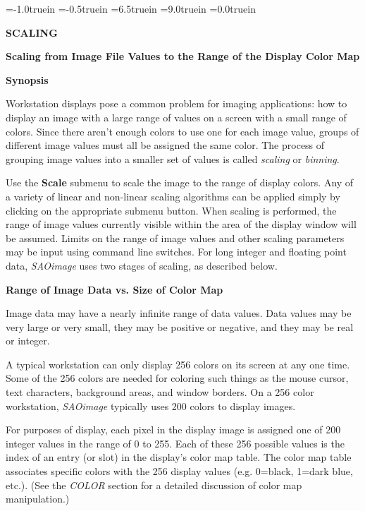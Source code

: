\voffset=-1.0truein
\hoffset=-0.5truein
\textwidth=6.5truein
\textheight=9.0truein
\parindent=0.0truein
\setcounter{page}{22}


\centerline{\Large \bf SCALING}
\vspace{0.2in}

\normalsize
\centerline{\bf Scaling from Image File Values to the Range of the
Display Color Map}
\vspace{0.2in}

{\bf Synopsis}
\par
\vspace{0.1in}
Workstation displays pose a common problem for imaging applications:
how to display an image with a large range of values on a screen
with a small range of colors.  Since there aren't enough colors to use
one for each image value, groups of different image values must all be
assigned the same color.  The process of grouping image values into a
smaller set of values is called {\em scaling} or {\em binning}.
\par
\vspace{0.1in}
Use the {\bf Scale} submenu to scale the image to the range of display
colors.  Any of a variety of linear and non-linear scaling algorithms
can be applied simply by clicking on the appropriate submenu button.
When scaling is performed, the range of image values currently visible
within the area of the display window will be assumed.  Limits on the
range of image values and other scaling parameters may be input using
command line switches.  For long integer and floating point data,
{\em SAOimage} uses two stages of scaling, as described below.
\newline
\vspace{0.1in}

{\bf Range of Image Data vs. Size of Color Map}
\par
\vspace{0.1in}
Image data may have a nearly infinite range of data values.  Data
values may be very large or very small, they may be positive or
negative, and they may be real or integer.
\par
\vspace{0.1in}
A typical workstation can only display 256 colors on its screen at any
one time.  Some of the 256 colors are needed for coloring such things
as the mouse cursor, text characters, background areas, and window
borders.  On a 256 color workstation, {\em SAOimage} typically uses
200 colors to display images.
\par
\vspace{0.1in}
For purposes of display, each pixel in the display image is assigned
one of 200 integer values in the range of 0 to 255.  Each of these
256 possible values is the index of an entry (or slot) in the
display's color map table.  The color map table associates specific
colors with the 256 display values (e.g. 0=black, 1=dark blue, etc.).
(See the {\em COLOR} section for a detailed discussion of color map
manipulation.)
\par
\vspace{0.2in}

